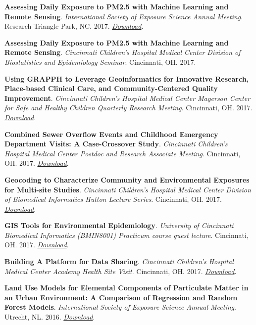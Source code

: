 \textbf{Assessing Daily Exposure to PM2.5 with Machine Learning and
Remote Sensing}. \emph{International Society of Exposure Science Annual
Meeting}. Research Triangle Park, NC. 2017.
\href{https://colebrokamp-website.s3.amazonaws.com/talks/spatiotemporal_pm_model_talk_ISES2017.pdf}{\emph{Download}}.

\textbf{Assessing Daily Exposure to PM2.5 with Machine Learning and
Remote Sensing}. \emph{Cincinnati Children's Hospital Medical Center
Division of Biostatistics and Epidemiology Seminar}. Cincinnati, OH.
2017.

\textbf{Using GRAPPH to Leverage Geoinformatics for Innovative Research,
Place-based Clinical Care, and Community-Centered Quality Improvement}.
\emph{Cincinnati Children's Hospital Medical Center Mayerson Center for
Safe and Healthy Children Quarterly Research Meeting}. Cincinnati, OH.
2017.
\href{http://colebrokamp-website.s3.amazonaws.com/talks/GRAPPH_talk_MayersonCenter_16June2017.pdf}{\emph{Download}}.

\textbf{Combined Sewer Overflow Events and Childhood Emergency
Department Visits: A Case-Crossover Study}. \emph{Cincinnati Children's
Hospital Medical Center Postdoc and Research Associate Meeting}.
Cincinnati, OH. 2017.
\href{http://colebrokamp-website.s3.amazonaws.com/talks/cso_talk_3_April_2017.pdf}{\emph{Download}}.

\textbf{Geocoding to Characterize Community and Environmental Exposures
for Multi-site Studies}. \emph{Cincinnati Children's Hospital Medical
Center Division of Biomedical Informatics Hutton Lecture Series}.
Cincinnati, OH. 2017.
\href{http://colebrokamp-website.s3.amazonaws.com/talks/DeGAUSS_talk_Hutton.pdf}{\emph{Download}}.

\textbf{GIS Tools for Environmental Epidemiology}. \emph{University of
Cincinnati Biomedical Informatics (BMIN8001) Practicum course guest
lecture}. Cincinnati, OH. 2017.
\href{http://colebrokamp-website.s3.amazonaws.com/talks/BMIN8001_environmental_epidemiology.pdf}{\emph{Download}}.

\textbf{Building A Platform for Data Sharing}. \emph{Cincinnati
Children's Hospital Medical Center Academy Health Site Visit}.
Cincinnati, OH. 2017.
\href{http://colebrokamp-website.s3.amazonaws.com/talks/academy_health_visit.pdf}{\emph{Download}}.

\textbf{Land Use Models for Elemental Components of Particulate Matter
in an Urban Environment: A Comparison of Regression and Random Forest
Models}. \emph{International Society of Exposure Science Annual
Meeting}. Utrecht, NL. 2016.
\href{http://colebrokamp-website.s3.amazonaws.com/talks/LUR_vs_LURF_Cole_Brokamp.pdf}{\emph{Download}}.

